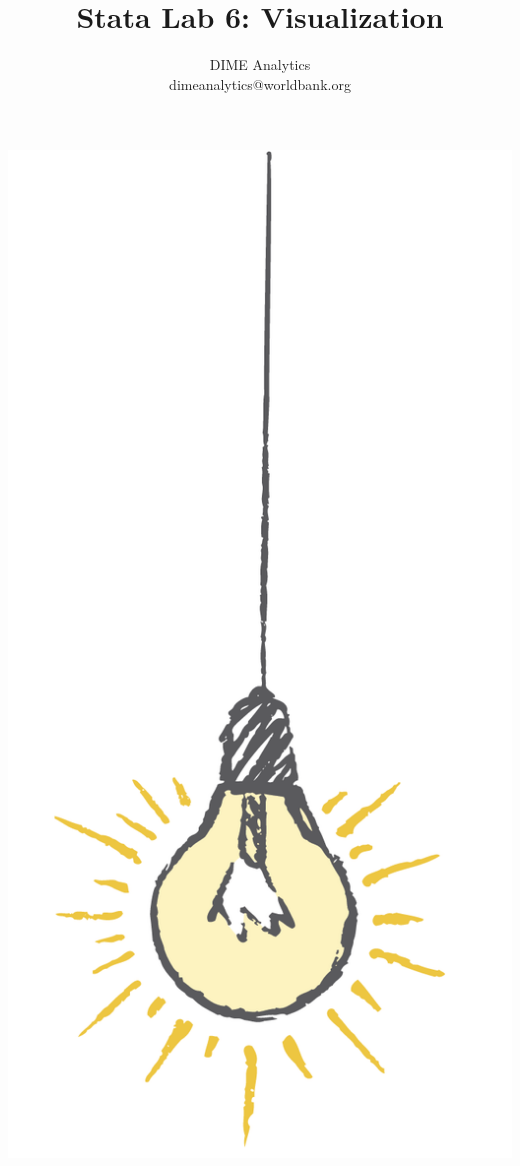 \documentclass{tufte-handout}
\title{Stata Lab 6: Visualization}
\author{DIME Analytics \\ dimeanalytics@worldbank.org}
\begin{document}
\maketitle%

\begin{marginfigure}%
  \includegraphics[width=\linewidth]{light.png}
\end{marginfigure}
\end{document}
